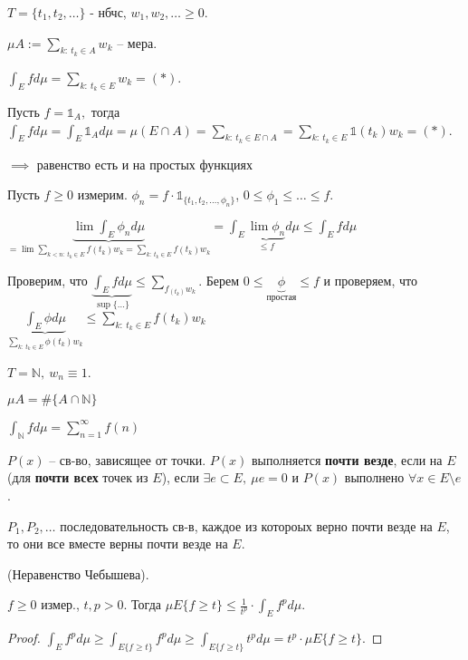 \begin{example}
    $T = \{ t_1, t_2, \dots \}$ - нбчс, $w_1, w_2, \dots \geq 0$.

    $\mu A := \sum_{k: \ t_k \in A}{w_k}$ -- мера.

    $\int_E{f d \mu} = \sum_{k: \ t_k \in E}{w_k} = (*)$.

    Пусть $f = \mathbb{1}_A, $ тогда $\int_E{f d \mu} = \int_E{\mathbb{1}_A d \mu} = \mu (E \cap A) = \sum_{k: \ t_k \in E \cap A} = \sum_{k: \ t_k \in E}{\mathbb{1}(t_k) w_k} = (*)$. \newline

    $\implies$ равенство есть и на простых функциях

    Пусть $f \geq 0$ измерим. $\phi_n = f \cdot \mathbb{1}_{\{ t_1, t_2, \dots, \phi_n \}}$, $0 \leq \phi_1 \leq \dots \leq f$.

    $\underbrace{\lim{\int_E{\phi_n d \mu}}}_{= \lim \sum_{k<n: \ t_k \in E}{f(t_k) w_k} = \sum_{k: \ t_k \in E}{f(t_k) w_k}} = \int_E{\underbrace{\lim{\phi_n}}_{\leq f} d \mu} \leq \int_E {f d \mu}$

    Проверим, что $\underbrace{\int_E{f d \mu}}_{\sup \{ \dots\}} \leq \sum_{f_(t_k)w_k}$. Берем $0 \leq \underbrace{\phi}_{\text{простая}} \leq f$ и проверяем, что $\underbrace{\int_E{\phi d \mu}}_{\sum_{k: \ t_k \in E}{\phi(t_k) w_k}} \leq \sum_{k: \ t_k \in E}{f(t_k)w_k}$
\end{example}
\begin{remark}
    $T = \mathbb{N}, \ w_n \equiv 1$.

    $\mu A = \#\{ A \cap \mathbb{N} \}$

    $\int_{\mathbb{N}}{f d \mu} = \sum_{n=1}^{\infty} f(n)$
\end{remark}

\begin{definition}
    $P(x)$ -- св-во, зависящее от точки. $P(x)$ выполняется \textbf{почти везде}, если на $E$ (для \textbf{почти всех} точек из $E$), если $\exists e \subset E, \ \mu e = 0$ и $P(x)$ выполнено $\forall x \in E \setminus e$.
\end{definition}

\begin{remark}
    $P_1, P_2, \dots$ последовательность св-в, каждое из котороых верно почти везде на $E$, то они все вместе верны почти везде на $E$.
\end{remark}

\begin{theorem}
    (Неравенство Чебышева).
    
    $f \geq 0$ измер., $t, p > 0$. Тогда $\mu E \{ f \geq t \} \leq \frac{1}{t^p} \cdot \int_E{f^p d \mu}$.
\end{theorem}
\begin{proof}
    $\int_E{f^p d \mu} \geq \int_{E\{ f \geq t \}}{f^p d \mu} \geq \int_{E\{ f \geq t \}}{t^p d \mu} = t^p \cdot \mu E \{ f \geq t \}$.
\end{proof}

